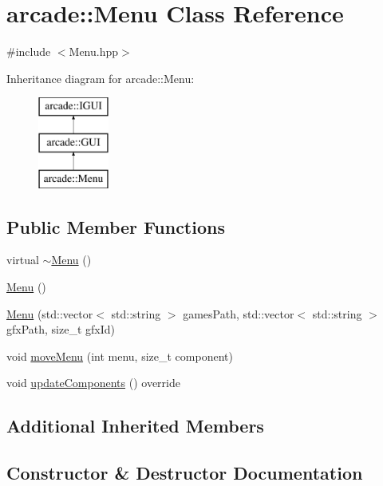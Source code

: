 \hypertarget{classarcade_1_1_menu}{}\section{arcade\+:\+:Menu Class Reference}
\label{classarcade_1_1_menu}


{\ttfamily \#include $<$Menu.\+hpp$>$}

Inheritance diagram for arcade\+:\+:Menu\+:\begin{figure}[H]
\begin{center}
\leavevmode
\includegraphics[height=3.000000cm]{classarcade_1_1_menu}
\end{center}
\end{figure}
\subsection*{Public Member Functions}
\begin{DoxyCompactItemize}
\item 
virtual \hyperlink{classarcade_1_1_menu_a2010367feb73b005d247f74fa0563d72}{$\sim$\+Menu} ()
\item 
\hyperlink{classarcade_1_1_menu_a1dab304f5e07c98f6527a0dac57db46b}{Menu} ()
\item 
\hyperlink{classarcade_1_1_menu_ab94e3c0b8e8db84a50e9748c02f648ce}{Menu} (std\+::vector$<$ std\+::string $>$ games\+Path, std\+::vector$<$ std\+::string $>$ gfx\+Path, size\+\_\+t gfx\+Id)
\item 
void \hyperlink{classarcade_1_1_menu_a1a18e92410e231d70277606f5c8bd4e9}{move\+Menu} (int menu, size\+\_\+t component)
\item 
void \hyperlink{classarcade_1_1_menu_a63906aaba91a3be7b0f4f8dcc46e87f4}{update\+Components} () override
\end{DoxyCompactItemize}
\subsection*{Additional Inherited Members}


\subsection{Constructor \& Destructor Documentation}
\mbox{\label{classarcade_1_1_menu_a2010367feb73b005d247f74fa0563d72}} 
